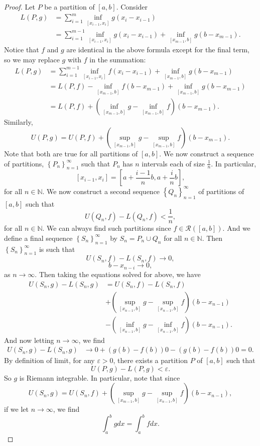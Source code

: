 \documentclass[12pt]{article}
\newcommand{\N}{\mathbb{N}}
\newcommand{\RR}{\mathcal{R}}
\newcommand{\eps}{\varepsilon}
\newcommand{\seq}[1]{\left\{#1\right\}_{n=1}^\infty}
\begin{document}
\begin{enumerate}
\begin{proof}
    Let $P$ be a partition of $[a,b]$. Consider
    \begin{align*}
        L(P,g)
            &= \sum_{i=1}^m\inf_{[x_{i-1},x_i]}g(x_i-x_{i-1}) \\
            &= \sum_{i=1}^{m-1}\inf_{[x_{i-1},x_i]}g(x_i-x_{i-1}) + \inf_{[x_{m-1},b]}g(b-x_{m-1}).
    \end{align*}
    Notice that $f$ and $g$ are identical in the above formula except for the final term, so we may replace $g$ with $f$ in the summation:
    \begin{align*}
        L(P,g)
            &= \sum_{i=1}^{m-1}\inf_{[x_{i-1},x_i]}f(x_i-x_{i-1}) + \inf_{[x_{m-1},b]}g(b-x_{m-1}) \\
            &= L(P,f)-\inf_{[x_{m-1},b]}f(b-x_{m-1})+ \inf_{[x_{m-1},b]}g(b-x_{m-1}) \\
            &= L(P,f) + (\inf_{[x_{m-1},b]}g -\inf_{[x_{m-1},b]}f)(b-x_{m-1}).
    \end{align*}
    Similarly,
    \[U(P,g) = U(P,f) + (\sup_{[x_{m-1},b]}g -\sup_{[x_{m-1},b]}f)(b-x_{m-1}).\]
    Note that both are true for all partitions of $[a,b]$. We now construct a sequence of partitions, $\seq{P_n}$ such that $P_n$ has $n$ intervals each of size $\frac1n$. In particular,
    \[[x_{i-1},x_i] = \left[a+\frac{i-1}nb, a+\frac{i}nb\right],\]
    for all $n\in\N$. We now construct a second sequence $\seq{Q_n}$ of partitions of $[a,b]$ such that
    \[U(Q_n,f)-L(Q_n,f)<\frac1n,\]
    for all $n\in\N$. We can always find such partitions since $f\in\RR([a,b])$. And we define a final sequence $\seq{S_n}$ by $S_n = P_n\cup Q_n$ for all $n\in\N$. Then $\seq{S_n}$ is such that
    \[U(S_n,f)-L(S_n,f) \to 0,\]
    \[b-x_{n-i} \to 0,\]
    as $n\to\infty$. Then taking the equations solved for above, we have
    \begin{align*}
        U(S_n,g) - L(S_n,g)
            &= U(S_n,f) - L(S_n,f) \\
            &+ (\sup_{[x_{n-1},b]}g-\sup_{[x_{n-1},b]}f)(b-x_{n-1}) \\
            &- (\inf_{[x_{n-1},b]}g-\inf_{[x_{n-1},b]}f)(b-x_{n-1}).
    \end{align*}
    And now letting $n\to\infty$, we find
    \begin{align*}
        U(S_n,g) - L(S_n,g)
            &\to 0 + (g(b)-f(b))0 - (g(b)-f(b))0 = 0.
    \end{align*}
    By definition of limit, for any $\eps>0$, there exists a partition $P$ of $[a,b]$ such that
    \[U(P,g) - L(P,g) < \eps.\]
    So $g$ is Riemann integrable. In particular, note that since
    \[U(S_n,g) = U(S_n,f) + (\sup_{[x_{m-1},b]}g -\sup_{[x_{n-1},b]}f)(b-x_{n-1}),\]
    if we let $n\to\infty$, we find
    \[\int_a^bgdx = \int_a^bfdx.\]
    
\end{proof}

\end{enumerate}
\end{document}
